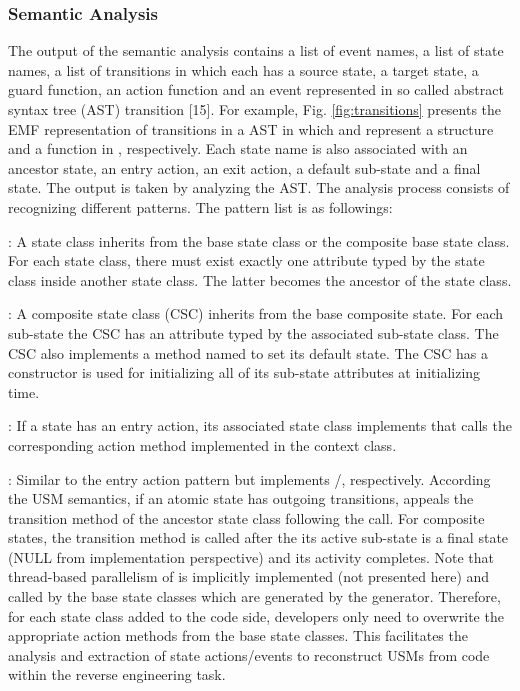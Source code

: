 \subsubsection{Semantic Analysis}
\label{subsec:verification}
The output of the semantic analysis contains a list of event names, a list of state names, a list of transitions in which each has a source state, a target state, a guard function, an action function and an event represented in so called abstract syntax tree (AST) transition [15]. 
For example, Fig. \ref{fig:transitions} presents the EMF \cite{gronback_eclipse_} representation of transitions in a  AST in which  and  represent a structure and a function in , respectively. 
Each state name is also associated with an ancestor state, an entry action, an exit action, a default sub-state and a final state. 
The output is taken by analyzing the AST. 
The analysis process consists of recognizing different patterns. 
The pattern list is as followings:

\noindent
{}: A state class inherits from the base state class or the composite base state class. 
For each state class, there must exist exactly one attribute typed by the state class inside another state class. 
The latter becomes the ancestor of the state class.

\noindent
{}: A composite state class (CSC) inherits from the base composite state. 
For each sub-state the CSC has an attribute typed by the associated sub-state class. 
The CSC also implements a method named  to set its default state. 
The CSC has a constructor is used for initializing all of its sub-state attributes at initializing time.

\noindent
{}: If a state has an entry action, its associated state class implements  that calls the corresponding action method implemented in the context class. 

\noindent
{}: Similar to the entry action pattern but implements /, respectively. 
According the USM semantics, if an atomic state has outgoing  transitions,  appeals the  transition method of the ancestor state class following the   call. For composite states, the  transition method is called after the its active sub-state is a final state (NULL from implementation perspective) and its activity completes. Note that thread-based parallelism of  is implicitly implemented (not presented here) and called by the base state classes which are generated by the generator. Therefore, for each state class added to the code side, developers only need to overwrite the appropriate action methods from the base state classes. This facilitates the analysis and extraction of state actions/events to reconstruct USMs from code within the reverse engineering task.

